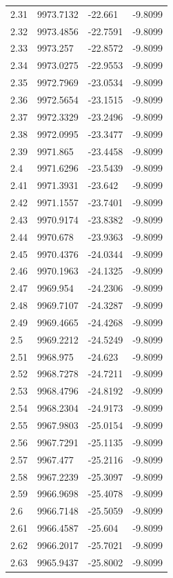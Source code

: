 \begin{table}[H]
\begin{tabular}{llll}
2.31 & 9973.7132 & -22.661 & -9.8099 \\
2.32 & 9973.4856 & -22.7591 & -9.8099 \\
2.33 & 9973.257 & -22.8572 & -9.8099 \\
2.34 & 9973.0275 & -22.9553 & -9.8099 \\
2.35 & 9972.7969 & -23.0534 & -9.8099 \\
2.36 & 9972.5654 & -23.1515 & -9.8099 \\
2.37 & 9972.3329 & -23.2496 & -9.8099 \\
2.38 & 9972.0995 & -23.3477 & -9.8099 \\
2.39 & 9971.865 & -23.4458 & -9.8099 \\
2.4 & 9971.6296 & -23.5439 & -9.8099 \\
2.41 & 9971.3931 & -23.642 & -9.8099 \\
2.42 & 9971.1557 & -23.7401 & -9.8099 \\
2.43 & 9970.9174 & -23.8382 & -9.8099 \\
2.44 & 9970.678 & -23.9363 & -9.8099 \\
2.45 & 9970.4376 & -24.0344 & -9.8099 \\
2.46 & 9970.1963 & -24.1325 & -9.8099 \\
2.47 & 9969.954 & -24.2306 & -9.8099 \\
2.48 & 9969.7107 & -24.3287 & -9.8099 \\
2.49 & 9969.4665 & -24.4268 & -9.8099 \\
2.5 & 9969.2212 & -24.5249 & -9.8099 \\
2.51 & 9968.975 & -24.623 & -9.8099 \\
2.52 & 9968.7278 & -24.7211 & -9.8099 \\
2.53 & 9968.4796 & -24.8192 & -9.8099 \\
2.54 & 9968.2304 & -24.9173 & -9.8099 \\
2.55 & 9967.9803 & -25.0154 & -9.8099 \\
2.56 & 9967.7291 & -25.1135 & -9.8099 \\
2.57 & 9967.477 & -25.2116 & -9.8099 \\
2.58 & 9967.2239 & -25.3097 & -9.8099 \\
2.59 & 9966.9698 & -25.4078 & -9.8099 \\
2.6 & 9966.7148 & -25.5059 & -9.8099 \\
2.61 & 9966.4587 & -25.604 & -9.8099 \\
2.62 & 9966.2017 & -25.7021 & -9.8099 \\
2.63 & 9965.9437 & -25.8002 & -9.8099 \\

\end{tabular}
\end{table}
